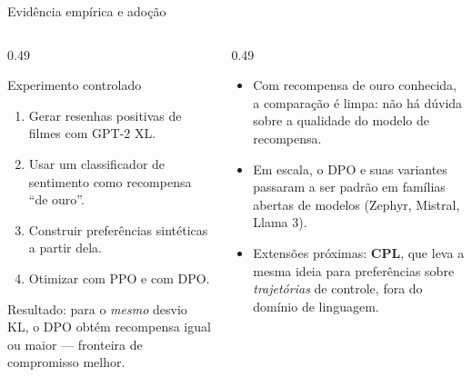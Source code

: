 \documentclass[aspectratio=169, 11pt]{beamer}
\begin{document}
\begin{frame}{Evidência empírica e adoção}

  \begin{columns}[T]
  \begin{column}{0.49\textwidth}
    \begin{defbox}{Experimento controlado}
      \begin{enumerate}\setlength{\itemsep}{0ex}
        \item Gerar resenhas positivas de filmes com GPT-2 XL.
        \item Usar um classificador de sentimento como recompensa ``de ouro''.
        \item Construir preferências sintéticas a partir dela.
        \item Otimizar com PPO e com DPO.
      \end{enumerate}
      Resultado: para o \emph{mesmo} desvio KL, o DPO obtém recompensa igual ou
      maior --- fronteira de compromisso melhor.
    \end{defbox}
  \end{column}
  \begin{column}{0.49\textwidth}
    \begin{itemize}\setlength{\itemsep}{0.3ex}
      \item Com recompensa de ouro conhecida, a comparação é limpa: não há
        dúvida sobre a qualidade do modelo de recompensa.
      \item Em escala, o DPO e suas variantes passaram a ser padrão em famílias
        abertas de modelos (Zephyr, Mistral, Llama 3).
      \item Extensões próximas: \textbf{CPL}, que leva a mesma ideia para
        preferências sobre \emph{trajetórias} de controle, fora do domínio de
        linguagem.
    \end{itemize}
  \end{column}
  \end{columns}
\end{frame}
\end{document}
